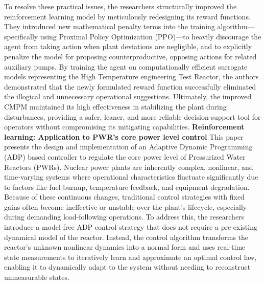 \documentclass{article}
\begin{document}
\newline
To resolve these practical issues, the researchers structurally improved the reinforcement learning model by meticulously redesigning its reward functions. They introduced new mathematical penalty terms into the training algorithm—specifically using Proximal Policy Optimization (PPO)—to heavily discourage the agent from taking action when plant deviations are negligible, and to explicitly penalize the model for proposing counterproductive, opposing actions for related auxiliary pumps. By training the agent on computationally efficient surrogate models representing the High Temperature engineering Test Reactor, the authors demonstrated that the newly formulated reward function successfully eliminated the illogical and unnecessary operational suggestions. Ultimately, the improved CMPM maintained its high effectiveness in stabilizing the plant during disturbances, providing a safer, leaner, and more reliable decision-support tool for operators without compromising its mitigating capabilities.
\newline
\textbf{Reinforcement learning: Application to PWR's core power level control}
\newline
This paper presents the design and implementation of an Adaptive Dynamic Programming (ADP) based controller to regulate the core power level of Pressurized Water Reactors (PWRs). Nuclear power plants are inherently complex, nonlinear, and time-varying systems where operational characteristics fluctuate significantly due to factors like fuel burnup, temperature feedback, and equipment degradation. Because of these continuous changes, traditional control strategies with fixed gains often become ineffective or unstable over the plant's lifecycle, especially during demanding load-following operations. To address this, the researchers introduce a model-free ADP control strategy that does not require a pre-existing dynamical model of the reactor. Instead, the control algorithm transforms the reactor's unknown nonlinear dynamics into a normal form and uses real-time state measurements to iteratively learn and approximate an optimal control law, enabling it to dynamically adapt to the system without needing to reconstruct unmeasurable states.
\newline
\end{document}
